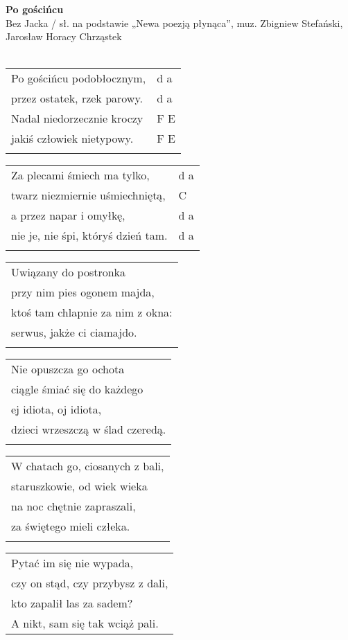 \documentclass[a5paper]{article}
\begin{document}


\noindent
\fontsize{12pt}{15pt}\selectfont
\textbf{Po gościńcu} \\
\fontsize{8pt}{10pt}\selectfont
Bez Jacka / sł. na podstawie „Newa poezją płynąca”, muz. Zbigniew Stefański, Jarosław Horacy Chrząstek\\ \\
\fontsize{10pt}{12pt}\selectfont
{}
\begin{tabular}{@{}p{7.50cm}p{3cm}@{}}
\noindent
Po gościńcu podobłocznym, & d a \\
przez ostatek, rzek parowy. & d a \\
Nadal niedorzecznie kroczy & F E \\
jakiś człowiek nietypowy. & F E \\ \\
\end{tabular}

\noindent
\begin{tabular}{@{}p{7.50cm}p{3cm}@{}}
Za plecami śmiech ma tylko, & d a \\
twarz niezmiernie uśmiechniętą, & C \\
a przez napar i omyłkę, & d a \\
nie je, nie śpi, któryś dzień tam. & d a \\ \\
\end{tabular}

\noindent
\begin{tabular}{@{}p{7.50cm}@{}}
Uwiązany do postronka \\
przy nim pies ogonem majda, \\
ktoś tam chlapnie za nim z okna: \\
serwus, jakże ci ciamajdo. \\ \\
\end{tabular}

\noindent
\begin{tabular}{@{}p{7.50cm}@{}}
Nie opuszcza go ochota \\
ciągle śmiać się do każdego \\ 
ej idiota, oj idiota, \\
dzieci wrzeszczą w ślad czeredą. \\ \\
\end{tabular}

\noindent
\begin{tabular}{@{}p{7.50cm}@{}}
W chatach go, ciosanych z bali, \\
staruszkowie, od wiek wieka \\
na noc chętnie zapraszali, \\
za świętego mieli człeka. \\ \\
\end{tabular}

\noindent
\begin{tabular}{@{}p{7.50cm}@{}}
Pytać im się nie wypada, \\
czy on stąd, czy przybysz z dali, \\
kto zapalił las za sadem? \\
A nikt, sam się tak wciąż pali.
\end{tabular}
\end{document}
